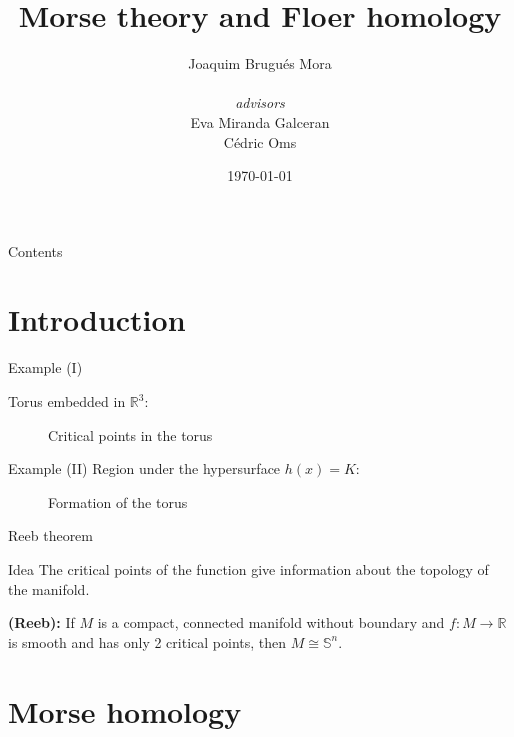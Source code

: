 \documentclass{beamer}
\title{Morse theory and Floer homology}
\author{Joaquim Brugués Mora \\ \ \\ {\it advisors } \\ Eva Miranda Galceran \\ Cédric Oms}
\institute{Facultat de Matemàtiques i Estadística\\ UPC}
\date{\today}
\newcommand{\con}[1]{\mathbb{#1}}
\newcommand{\R}{\con{R}}
\begin{document}
\begin{frame}
	\titlepage
\end{frame}

\begin{frame}{Contents}
	\tableofcontents
\end{frame}

\section{Introduction}
\begin{frame}{Example (I)}
	
	Torus embedded in $\R^3$:

	\begin{figure}[h]
		
		\caption{Critical points in the torus}
		\label{figure:torus1}
	\end{figure}
\end{frame}

\begin{frame}{Example (II)}
	Region under the hypersurface $h(x) = K$:

	\begin{figure}[h]
		\scalebox{.6}{}
		\scalebox{.6}{}
		\caption{Formation of the torus}
		\label{figure:torus2}
	\end{figure}
\end{frame}

\begin{frame}{Reeb theorem}
	\begin{block}{Idea}
		The critical points of the function give information about the topology of the manifold.

	\end{block}

	\begin{figure}[h]
		
		\label{figure:reebtheorem}
	\end{figure}

	\begin{theorem}
		{\bf (Reeb):} If $M$ is a compact, connected manifold without boundary and $f : M \rightarrow \R$ is smooth and has only 2 critical points, then $M \cong \con{S}^n$.
	\end{theorem}
\end{frame}

\section{Morse homology}
\end{document}
